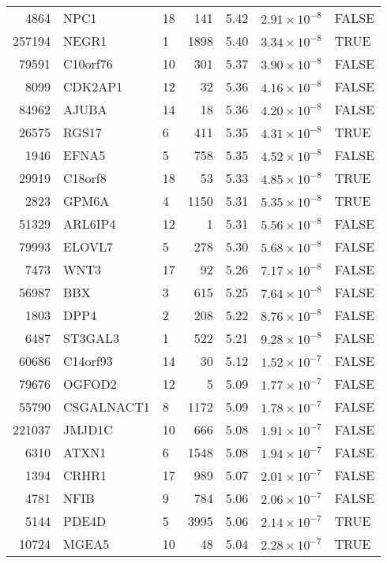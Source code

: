 \begin{table}[ht]
\begin{adjustbox}{totalheight=10in}
\begin{tabular}{rllrrrl}
  4864 & NPC1 & 18 & 141 & 5.42 & $2.91 \times 10^{-8}$ & FALSE \\ 
  257194 & NEGR1 & 1 & 1898 & 5.40 & $3.34 \times 10^{-8}$ & TRUE \\ 
  79591 & C10orf76 & 10 & 301 & 5.37 & $3.90 \times 10^{-8}$ & FALSE \\ 
  8099 & CDK2AP1 & 12 &  32 & 5.36 & $4.16 \times 10^{-8}$ & FALSE \\ 
  84962 & AJUBA & 14 &  18 & 5.36 & $4.20 \times 10^{-8}$ & FALSE \\ 
  26575 & RGS17 & 6 & 411 & 5.35 & $4.31 \times 10^{-8}$ & TRUE \\ 
  1946 & EFNA5 & 5 & 758 & 5.35 & $4.52 \times 10^{-8}$ & FALSE \\ 
  29919 & C18orf8 & 18 &  53 & 5.33 & $4.85 \times 10^{-8}$ & TRUE \\ 
  2823 & GPM6A & 4 & 1150 & 5.31 & $5.35 \times 10^{-8}$ & TRUE \\ 
  51329 & ARL6IP4 & 12 &   1 & 5.31 & $5.56 \times 10^{-8}$ & FALSE \\ 
  79993 & ELOVL7 & 5 & 278 & 5.30 & $5.68 \times 10^{-8}$ & FALSE \\ 
  7473 & WNT3 & 17 &  92 & 5.26 & $7.17 \times 10^{-8}$ & FALSE \\ 
  56987 & BBX & 3 & 615 & 5.25 & $7.64 \times 10^{-8}$ & FALSE \\ 
  1803 & DPP4 & 2 & 208 & 5.22 & $8.76 \times 10^{-8}$ & FALSE \\ 
  6487 & ST3GAL3 & 1 & 522 & 5.21 & $9.28 \times 10^{-8}$ & FALSE \\ 
  60686 & C14orf93 & 14 &  30 & 5.12 & $1.52 \times 10^{-7}$ & FALSE \\ 
  79676 & OGFOD2 & 12 &   5 & 5.09 & $1.77 \times 10^{-7}$ & FALSE \\ 
  55790 & CSGALNACT1 & 8 & 1172 & 5.09 & $1.78 \times 10^{-7}$ & FALSE \\ 
  221037 & JMJD1C & 10 & 666 & 5.08 & $1.91 \times 10^{-7}$ & FALSE \\ 
  6310 & ATXN1 & 6 & 1548 & 5.08 & $1.94 \times 10^{-7}$ & FALSE \\ 
  1394 & CRHR1 & 17 & 989 & 5.07 & $2.01 \times 10^{-7}$ & FALSE \\ 
  4781 & NFIB & 9 & 784 & 5.06 & $2.06 \times 10^{-7}$ & FALSE \\ 
  5144 & PDE4D & 5 & 3995 & 5.06 & $2.14 \times 10^{-7}$ & TRUE \\ 
  10724 & MGEA5 & 10 &  48 & 5.04 & $2.28 \times 10^{-7}$ & TRUE \\ 

\end{tabular}
\end{adjustbox}
\end{table}
